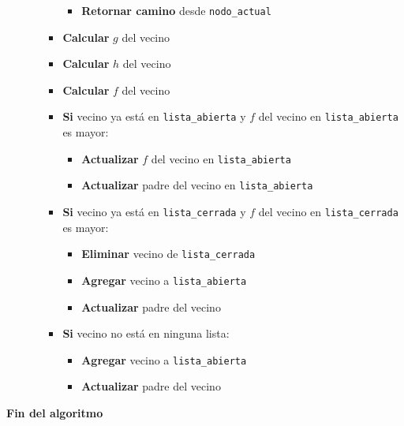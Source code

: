 \begin{enumerate}
\begin{enumerate}
\begin{itemize}
                        \begin{itemize}
                            \item \textbf{Retornar camino} desde \texttt{nodo\_actual}
                        \end{itemize}
                    \item \textbf{Calcular} $g$ del vecino
                    \item \textbf{Calcular} $h$ del vecino
                    \item \textbf{Calcular} $f$ del vecino
                    \item \textbf{Si} vecino ya está en \texttt{lista\_abierta} y $f$ del vecino en \texttt{lista\_abierta} es mayor:
                        \begin{itemize}
                            \item \textbf{Actualizar} $f$ del vecino en \texttt{lista\_abierta}
                            \item \textbf{Actualizar} padre del vecino en \texttt{lista\_abierta}
                        \end{itemize}
                    \item \textbf{Si} vecino ya está en \texttt{lista\_cerrada} y $f$ del vecino en \texttt{lista\_cerrada} es mayor:
                        \begin{itemize}
                            \item \textbf{Eliminar} vecino de \texttt{lista\_cerrada}
                            \item \textbf{Agregar} vecino a \texttt{lista\_abierta}
                            \item \textbf{Actualizar} padre del vecino
                        \end{itemize}
                    \item \textbf{Si} vecino no está en ninguna lista:
                        \begin{itemize}
                            \item \textbf{Agregar} vecino a \texttt{lista\_abierta}
                            \item \textbf{Actualizar} padre del vecino
                        \end{itemize}
                \end{itemize}
        \end{enumerate}

\end{enumerate}

\textbf{Fin del algoritmo}
